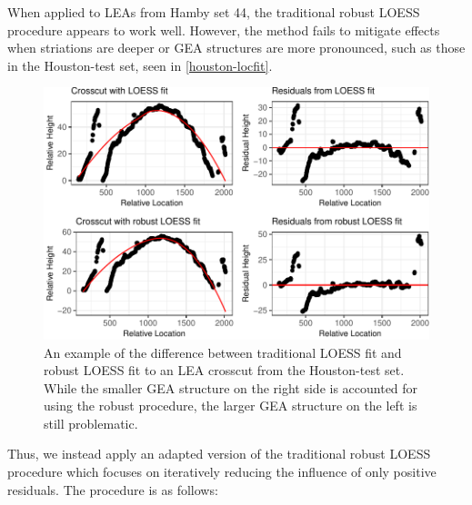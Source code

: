 \documentclass[12pt]{article}
\begin{document}
When applied to LEAs from Hamby set 44, the traditional robust LOESS
procedure appears to work well. However, the method fails to mitigate
effects when striations are deeper or GEA structures are more
pronounced, such as those in the Houston-test set, seen in
\autoref{houston-locfit}.

\begin{figure}
\centering
\includegraphics{writeup_files/figure-latex/houston-locfit-1.pdf}
\caption{\label{houston-locfit}An example of the difference between
traditional LOESS fit and robust LOESS fit to an LEA crosscut from the
Houston-test set. While the smaller GEA structure on the right side is
accounted for using the robust procedure, the larger GEA structure on
the left is still problematic.}
\end{figure}

Thus, we instead apply an adapted version of the traditional robust
LOESS procedure which focuses on iteratively reducing the influence of
only positive residuals. The procedure is as follows:
\end{document}
